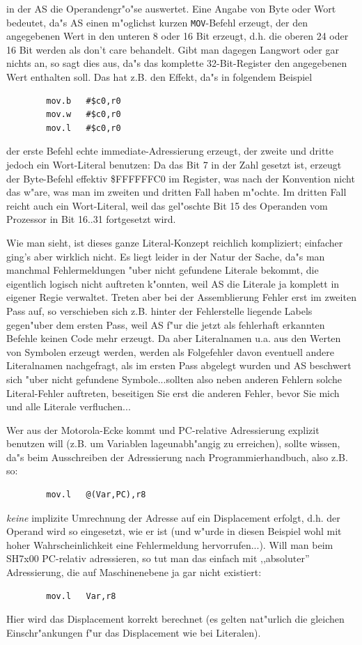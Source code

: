 \documentclass[12pt,a4paper,twoside]{report}
\newcommand{\tty}[1]{{\tt #1}}
\newcommand{\asname}{AS}
\begin{document}
in der \asname{} die Operandengr"o"se auswertet.  Eine Angabe von Byte oder
Wort bedeutet, da"s \asname{} einen m"oglichst kurzen \tty{MOV}-Befehl erzeugt,
der den angegebenen Wert in den unteren 8 oder 16 Bit erzeugt, d.h.
die oberen 24 oder 16 Bit werden als don't care behandelt.  Gibt
man dagegen Langwort oder gar nichts an, so sagt dies aus, da"s
das komplette 32-Bit-Register den angegebenen Wert enthalten soll.
Das hat z.B. den Effekt, da"s in folgendem Beispiel
\begin{verbatim}
        mov.b   #$c0,r0
        mov.w   #$c0,r0
        mov.l   #$c0,r0
\end{verbatim}
der erste Befehl echte immediate-Adressierung erzeugt, der zweite und
dritte jedoch ein Wort-Literal benutzen: Da das Bit 7 in der Zahl gesetzt
ist, erzeugt der Byte-Befehl effektiv \$FFFFFFC0 im Register, was nach
der Konvention nicht das w"are, was man im zweiten und dritten Fall haben
m"ochte.  Im dritten Fall reicht auch ein Wort-Literal, weil das gel"oschte
Bit 15 des Operanden vom Prozessor in Bit 16..31 fortgesetzt wird.
\par
Wie man sieht, ist dieses ganze Literal-Konzept reichlich kompliziert;
einfacher ging's aber wirklich nicht.  Es liegt leider in der Natur
der Sache, da"s man manchmal Fehlermeldungen "uber nicht gefundene
Literale bekommt, die eigentlich logisch nicht auftreten k"onnten, weil
\asname{} die Literale ja komplett in eigener Regie verwaltet.  Treten aber bei
der Assemblierung Fehler erst im zweiten Pass auf, so verschieben sich
z.B. hinter der Fehlerstelle liegende Labels gegen"uber dem ersten Pass,
weil \asname{} f"ur die jetzt als fehlerhaft erkannten Befehle keinen Code mehr
erzeugt.  Da aber Literalnamen u.a. aus den Werten von Symbolen erzeugt
werden, werden als Folgefehler davon eventuell andere Literalnamen
nachgefragt, als im ersten Pass abgelegt wurden und \asname{} beschwert sich
"uber nicht gefundene Symbole...sollten also neben anderen Fehlern solche
Literal-Fehler auftreten, beseitigen Sie erst die anderen Fehler, bevor
Sie mich und alle Literale verfluchen...
\par
Wer aus der Motorola-Ecke kommt und PC-relative Adressierung explizit
benutzen will (z.B. um Variablen lageunabh"angig zu erreichen), sollte
wissen, da"s beim Ausschreiben der Adressierung nach Programmierhandbuch,
also z.B. so:
\begin{verbatim}
        mov.l   @(Var,PC),r8
\end{verbatim}
{\it keine} implizite Umrechnung der Adresse auf ein Displacement erfolgt,
d.h. der Operand wird so eingesetzt, wie er ist (und w"urde in diesen
Beispiel wohl mit hoher Wahrscheinlichkeit eine Fehlermeldung
hervorrufen...).  Will man beim SH7x00 PC-relativ adressieren, so tut man
das einfach mit ,,absoluter'' Adressierung, die auf Maschinenebene ja
gar nicht existiert:
\begin{verbatim}
        mov.l   Var,r8
\end{verbatim}
Hier wird das Displacement korrekt berechnet (es gelten nat"urlich die
gleichen Einschr"ankungen f"ur das Displacement wie bei Literalen).
\end{document}
